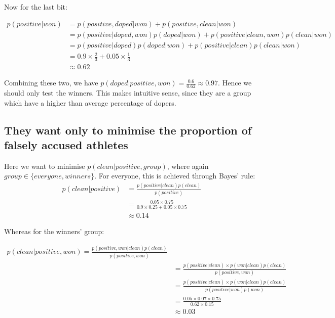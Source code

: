 \documentclass[11pt,fullpage]{book}
\begin{document}
Now for the last bit:

\begin{equation}
\begin{align}
p(positive|won) &= p(positive,doped|won) + p(positive,clean|won)\\
&= p(positive|doped,won) p(doped|won) + p(positive|clean,won) p(clean|won)\\
&= p(positive|doped) p(doped|won) + p(positive|clean) p(clean|won)\\
&= 0.9\times \frac{2}{3} + 0.05\times \frac{1}{3}\\
&\approx 0.62
\end{align}
\end{equation}

Combining these two, we have $p(doped|positive,won) = \frac{0.6}{0.62} \approx 0.97$. Hence we should only test the winners. This makes intuitive sense, since they are a group which have a higher than average percentage of dopers. 

\subsection{They want only to minimise the proportion of falsely accused athletes}
Here we want to minimise $p(clean|positive,group)$, where again $group\in\{everyone,winners\}$. For everyone, this is achieved through Bayes' rule:\\

\begin{equation}
\begin{align}
p(clean|positive) &= \frac{p(positive|clean) p(clean)}{p(positive)}\\
&= \frac{0.05\times 0.75}{0.9\times 0.25 + 0.05\times 0.75}\\
&\approx 0.14
\end{align}
\end{equation}

Whereas for the winners' group:

\begin{equation}
\begin{align}
p(clean|positive,won) = \frac{p(positive,won|clean)p(clean)}{p(positive,won)}\\
&= \frac{p(positive|clean)\times p(won|clean) p(clean)}{p(positive,won)}\\
&= \frac{p(positive|clean)\times p(won|clean) p(clean)}{p(positive|won) p(won)}\\
&= \frac{0.05\times 0.07\times 0.75}{0.62\times 0.15}\\
&\approx 0.03
\end{align}
\end{equation}
\end{document}
